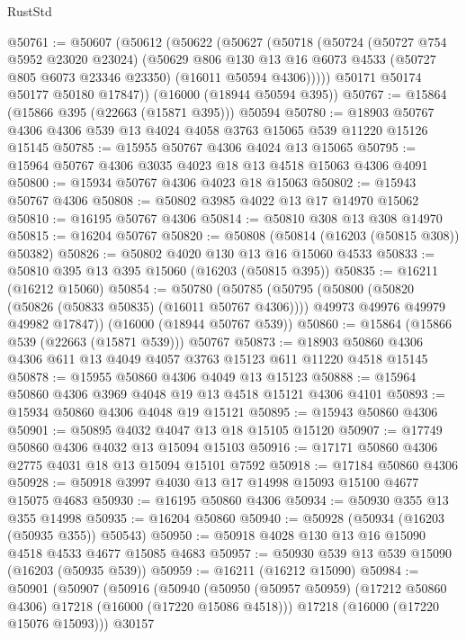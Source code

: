 \begin{lexlean}{RustStd}
\begin{coremodule}
@50761 := @50607
    (@50612
      (@50622
        (@50627
          (@50718
            (@50724
              (@50727 @754 @5952 @23020 @23024)
              (@50629
                @806
                @130
                @13
                @16
                @6073
                @4533
                (@50727 @805 @6073 @23346 @23350)
                (@16011 @50594 @4306)))))
        @50171
        @50174
        @50177
        @50180
        @17847))
    (@16000 (@18944 @50594 @395))
@50767 := @15864 (@15866 @395 (@22663 (@15871 @395))) @50594
@50780 := @18903 @50767 @4306 @4306 @539 @13 @4024 @4058 @3763 @15065 @539 @11220 @15126 @15145
@50785 := @15955 @50767 @4306 @4024 @13 @15065
@50795 := @15964 @50767 @4306 @3035 @4023 @18 @13 @4518 @15063 @4306 @4091
@50800 := @15934 @50767 @4306 @4023 @18 @15063
@50802 := @15943 @50767 @4306
@50808 := @50802 @3985 @4022 @13 @17 @14970 @15062
@50810 := @16195 @50767 @4306
@50814 := @50810 @308 @13 @308 @14970
@50815 := @16204 @50767
@50820 := @50808 (@50814 (@16203 (@50815 @308)) @50382)
@50826 := @50802 @4020 @130 @13 @16 @15060 @4533
@50833 := @50810 @395 @13 @395 @15060 (@16203 (@50815 @395))
@50835 := @16211 (@16212 @15060)
@50854 := @50780
    (@50785
      (@50795
        (@50800 (@50820 (@50826 (@50833 @50835) (@16011 @50767 @4306))))
        @49973
        @49976
        @49979
        @49982
        @17847))
    (@16000 (@18944 @50767 @539))
@50860 := @15864 (@15866 @539 (@22663 (@15871 @539))) @50767
@50873 := @18903 @50860 @4306 @4306 @611 @13 @4049 @4057 @3763 @15123 @611 @11220 @4518 @15145
@50878 := @15955 @50860 @4306 @4049 @13 @15123
@50888 := @15964 @50860 @4306 @3969 @4048 @19 @13 @4518 @15121 @4306 @4101
@50893 := @15934 @50860 @4306 @4048 @19 @15121
@50895 := @15943 @50860 @4306
@50901 := @50895 @4032 @4047 @13 @18 @15105 @15120
@50907 := @17749 @50860 @4306 @4032 @13 @15094 @15103
@50916 := @17171 @50860 @4306 @2775 @4031 @18 @13 @15094 @15101 @7592
@50918 := @17184 @50860 @4306
@50928 := @50918 @3997 @4030 @13 @17 @14998 @15093 @15100 @4677 @15075 @4683
@50930 := @16195 @50860 @4306
@50934 := @50930 @355 @13 @355 @14998
@50935 := @16204 @50860
@50940 := @50928 (@50934 (@16203 (@50935 @355)) @50543)
@50950 := @50918 @4028 @130 @13 @16 @15090 @4518 @4533 @4677 @15085 @4683
@50957 := @50930 @539 @13 @539 @15090 (@16203 (@50935 @539))
@50959 := @16211 (@16212 @15090)
@50984 := @50901
    (@50907
      (@50916
        (@50940
          (@50950 (@50957 @50959) (@17212 @50860 @4306) @17218 (@16000 (@17220 @15086 @4518)))
          @17218
          (@16000 (@17220 @15076 @15093)))
        @30157

\end{coremodule}
\end{lexlean}
